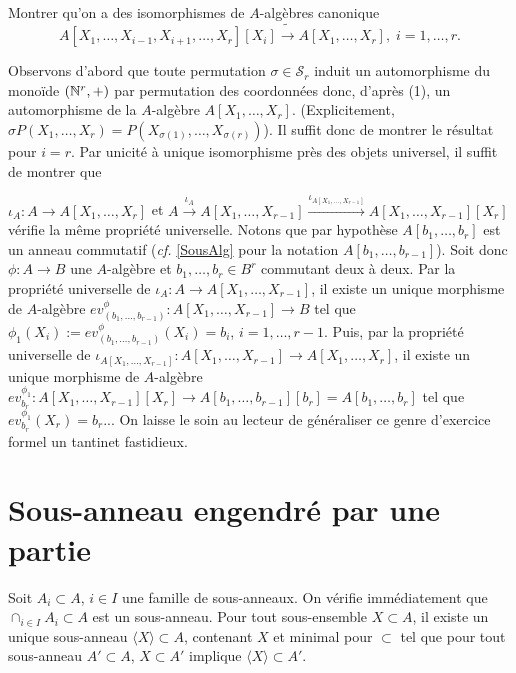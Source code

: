 \begin{exercice}
    Montrer qu'on a des isomorphismes de $A$-algèbres canonique $$
    A[X_1,\dots,X_{i-1},X_{i+1},\dots, X_r][X_i]\tilde{\rightarrow}
    A[X_1,\dots,X_r],\; i=1,\dots, r.$$
\end{exercice}

\begin{correction}
   Observons d'abord que toute permutation $\sigma\in \mathcal{S}_r$ induit un
   automorphisme du monoïde $(\mathbb{N}^r,+)$ par permutation des coordonnées donc,
   d'après (1), un automorphisme de la $A$-algèbre $A[X_1,\dots, X_r]$.
   (Explicitement, $\sigma P(X_1,\dots, X_r)=P(X_{\sigma(1)},\dots,
   X_{\sigma(r)})$). Il suffit donc de montrer le résultat pour $i=r$. Par
   unicité  à unique isomorphisme près des objets universel, il suffit de
   montrer que

   $\iota_A:A\rightarrow A[X_1,\dots, X_r]$ et
   $A\stackrel{\iota_A}{\rightarrow} A[X_1,\dots,
   X_{r-1}]\stackrel{\iota_{A[X_1,\dots, X_{r-1}]}}{\rightarrow} A[X_1,\dots,
   X_{r-1}][X_r]$ vérifie la même propriété universelle. Notons que par
   hypothèse  $A[b_1,\dots ,b_r]$ est un anneau commutatif (\textit{cf.}
   \ref{SousAlg} pour la notation $A[b_1,\dots, b_{r-1}]$). Soit donc
   $\phi:A\rightarrow B$ une $A$-algèbre et $b_1,\dots, b_r\in B^r$ commutant
   deux à deux. Par la propriété universelle de $\iota_A:A\rightarrow
   A[X_1,\dots, X_{r-1}]$, il existe un unique morphisme de $A$-algèbre
   $ev_{(b_1,\dots, b_{r-1})}^\phi:A[X_1,\dots,X_{r-1}]\rightarrow B$ tel que
   $\phi_1(X_i):=ev_{(b_1,\dots, b_{r-1})}^\phi(X_i)=b_i$, $i=1,\dots, r-1$.
   Puis, par la propriété universelle de $\iota_{A[X_1,\dots,
   X_{r-1}]}:A[X_1,\dots, X_{r-1}]\rightarrow A[X_1,\dots, X_r]$, il existe un
   unique morphisme de $A$-algèbre
   $ev_{b_r}^{\phi_1}:A[X_1,\dots,X_{r-1}][X_r]\rightarrow A[b_1,\dots
   ,b_{r-1}][b_r]=A[b_1,\dots,b_r]$ tel que $ev_{b_r}^{\phi_1}(X_r)=b_r$... On
   laisse le soin au lecteur de généraliser ce genre d'exercice formel un
   tantinet fastidieux.
\end{correction}

\section{Sous-anneau engendré par une partie}

Soit  $A_i\subset A$, $i\in I$ une famille de sous-anneaux. On vérifie
immédiatement que $\cap_{i\in I}A_i\subset A$ est un sous-anneau. Pour tout
sous-ensemble $X\subset A$, il existe un unique sous-anneau $\langle X\rangle
\subset A$, contenant $X$ et minimal pour $\subset$ \ie{} tel que pour  tout
sous-anneau $A'\subset A$,   $X\subset A'$ implique  $\langle X\rangle\subset
A'$.

